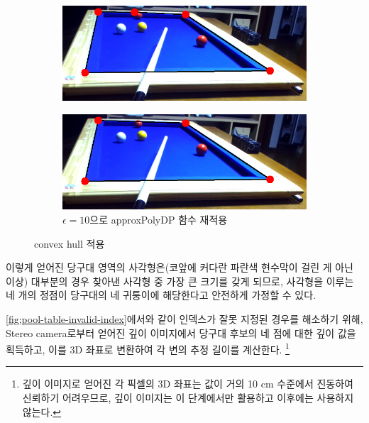 \documentclass[10pt]{oblivoir}
\begin{document}
\begin{figure}[ht]
    \centering
    \begin{subfigure}{8cm}
        \includegraphics[width=\textwidth]{img/billiards-table-low-angle-convex.png}
        \caption{}
        \label{fig;table-lowangle-convexhull-src}
    \end{subfigure}
    \begin{subfigure}{8cm}
        \includegraphics[width=\textwidth]{img/billiards-table-low-angle-convex-aprx.png}
        \caption{$\epsilon=10$으로 approxPolyDP 함수 재적용}
        \label{fig;table-lowangle-convexhull-aprx}
    \end{subfigure}
    \caption{convex hull 적용}
    \label{fig;table-lowangle-convexhull}
\end{figure}

이렇게 얻어진 당구대 영역의 사각형은(코앞에 커다란 파란색 현수막이 걸린 게 아닌 이상) 대부분의 경우 찾아낸 사각형 중 가장 큰 크기를 갖게 되므로, 사각형을 이루는 네 개의 정점이 당구대의 네 귀퉁이에 해당한다고 안전하게 가정할 수 있다.




\newpage

\cref{fig;pool-table-invalid-index}에서와 같이 인덱스가 잘못 지정된 경우를 해소하기 위해, Stereo camera로부터 얻어진 깊이 이미지에서 당구대 후보의 네 점에 대한 깊이 값을 획득하고, 이를 3D 좌표로 변환하여 각 변의 추정 길이를 계산한다.
\footnote{깊이 이미지로 얻어진 각 픽셀의 3D 좌표는 값이 거의 10 cm 수준에서 진동하여 신뢰하기 어려우므로, 깊이 이미지는 이 단계에서만 활용하고 이후에는 사용하지 않는다.}
\end{document}
